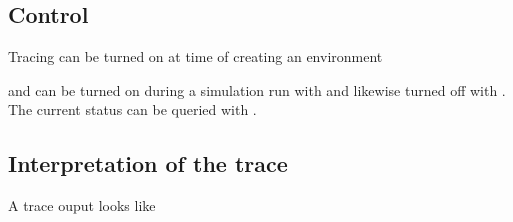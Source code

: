 \documentclass[letterpaper,10pt,english]{sphinxmanual}
\begin{document}
\subsection{Control}
\label{\detokenize{Miscellaneous:control}}
Tracing can be turned on at time of creating an environment

%
\begin{sphinxVerbatim}[commandchars=\\\{\}]
  
\end{sphinxVerbatim}

and can be turned on during a simulation run with  and likewise
turned off with . The current status can be queried with .


\subsection{Interpretation of the trace}
\label{\detokenize{Miscellaneous:interpretation-of-the-trace}}
A trace ouput looks like
\end{document}
